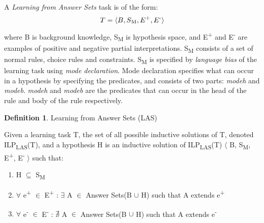 \documentclass[11pt,twoside]{report}
\theoremstyle{plain}
\theoremstyle{definition}
\newtheorem{defn}[thm]{Definition} %
\newtheorem{examp}{Example}[section]
\begin{document}
A \textit{Learning from Answer Sets} task is of the form:
\begin{equation}
\begin{split}
T = \langle B, S\textsubscript{M}, E\textsuperscript{+}, E\textsuperscript{-} \rangle
\end{split}
\label{las}
\end{equation}
where B is background knowledge, S\textsubscript{M} is hypothesis space, and E\textsuperscript{+} and E\textsuperscript{-} are examples of positive and negative partial interpretations. 
S\textsubscript{M} consists of a set of normal rules, choice rules and constraints. 
S\textsubscript{M} is specified by \textit{language bias} of the learning task using \textit{mode declaration}. 
Mode declaration specifies what can occur in a hypothesis by specifying the predicates, and consists of two parts: \textit{modeh} and \textit{modeb}. 
\textit{modeh} and \textit{modeb} are the predicates that can occur in the head of the rule and body of the rule respectively. 

\begin{defn}{Learning from Answer Sets (LAS)}

Given a learning task T, the set of all possible inductive solutions of T, denoted ILP\textsubscript{LAS}(T), and a hypothesis H is an inductive solution of ILP\textsubscript{LAS}(T) $\langle$ B, S\textsubscript{M}, E\textsuperscript{+}, E\textsuperscript{-} $\rangle$ such that:
\begin{enumerate}
\item H $\subseteq$ S\textsubscript{M}
\item $\forall$ e\textsuperscript{+} $\in$ E\textsuperscript{+} : $\exists$ A $\in$ Answer Sets(B $\cup$ H) such that A extends e\textsuperscript{+}
\item $\forall$ e\textsuperscript{-} $\in$ E\textsuperscript{-} : $\nexists$ A $\in$ Answer Sets(B $\cup$ H) such that A extends e\textsuperscript{-}
\end{enumerate}

\end{defn}


%
%
\end{document}
